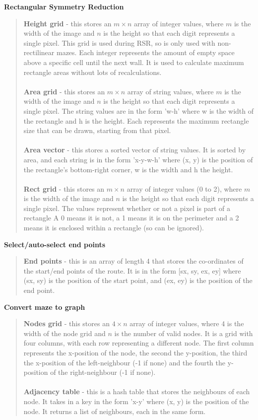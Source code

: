 \documentclass[titlepage]{article}
\begin{document}
\textbf{Rectangular Symmetry Reduction}
\begin{quote}
\textbf{Height grid} - this stores an $m \times n$ array of integer values, where $m$ is the width of the image and $n$ is the height so that each digit represents a single pixel. This grid is used during RSR, so is only used with non-rectilinear mazes. Each integer represents the amount of empty space above a specific cell until the next wall. It is used to calculate maximum rectangle areas without lots of recalculations.
\\\\
\textbf{Area grid} - this stores an $m \times n$ array of string values, where $m$ is the width of the image and $n$ is the height so that each digit represents a single pixel. The string values are in the form 'w-h' where w is the width of the rectangle and h is the height. Each represents the maximum rectangle size that can be drawn, starting from that pixel.
\\\\
\textbf{Area vector} - this stores a sorted vector of string values. It is sorted by area, and each string is in the form 'x-y-w-h' where (x, y) is the position of the rectangle's bottom-right corner, w is the width and h the height.
\\\\
\textbf{Rect grid} - this stores an $m \times n$ array of integer values (0 to 2), where $m$ is the width of the image and $n$ is the height so that each digit represents a single pixel. The values represent whether or not a pixel is part of a rectangle A 0 means it is not, a 1 means it is on the perimeter and a 2 means it is enclosed within a rectangle (so can be ignored).
\end{quote}

\textbf{Select/auto-select end points}
\begin{quote}
\textbf{End points} - this is an array of length 4 that stores the co-ordinates of the start/end points of the route. It is in the form [sx, sy, ex, ey] where (sx, sy) is the position of the start point, and (ex, ey) is the position of the end point.
\end{quote}

\textbf{Convert maze to graph}
\begin{quote}
\textbf{Nodes grid} - this stores an $4 \times n$ array of integer values, where 4 is the width of the node grid and $n$ is the number of valid nodes. It is a grid with four columns, with each row representing a different node. The first column represents the x-position of the node, the second the y-position, the third the x-position of the left-neighbour (-1 if none) and the fourth the y-position of the right-neighbour (-1 if none).
\\\\
\textbf{Adjacency table} - this is a hash table that stores the neighbours of each node. It takes in a key in the form 'x-y' where (x, y) is the position of the node. It returns a list of neighbours, each in the same form.
\end{quote}
\end{document}
